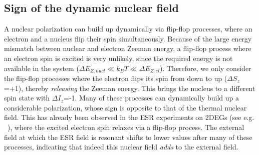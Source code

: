 \documentclass[rmp,twocolumn,aps]{revtex4}
\begin{document}
\subsection{Sign of the dynamic nuclear field}
A nuclear polarization can build up dynamically via flip-flop
processes, where an electron and a nucleus flip their spin
simultaneously. Because of the large energy mismatch between
nuclear and electron Zeeman energy, a flip-flop process where an
electron spin is excited is very unlikely, since the required
energy is not available in the system ($\Delta
E_{Z,nucl}\!\ll\!k_BT\!\ll\!\Delta E_{Z,el}$). Therefore, we only
consider the flip-flop processes where the electron flips its spin
from down to up ($\Delta S_z$=+1), thereby \textit{releasing} the
Zeeman energy. This brings the nucleus to a different spin state
with $\Delta I_z$=-1. Many of these processes can dynamically
build up a considerable polarization, whose sign is opposite to
that of the thermal nuclear field. This has already been observed
in the ESR experiments on 2DEGs (see e.g. ~\textcite{dobers88}),
where the excited electron spin relaxes via a flip-flop process.
The external field at which the ESR field is resonant shifts to
lower values after many of these processes, indicating that indeed
this nuclear field \textit{adds} to the external field.



\end{document}
